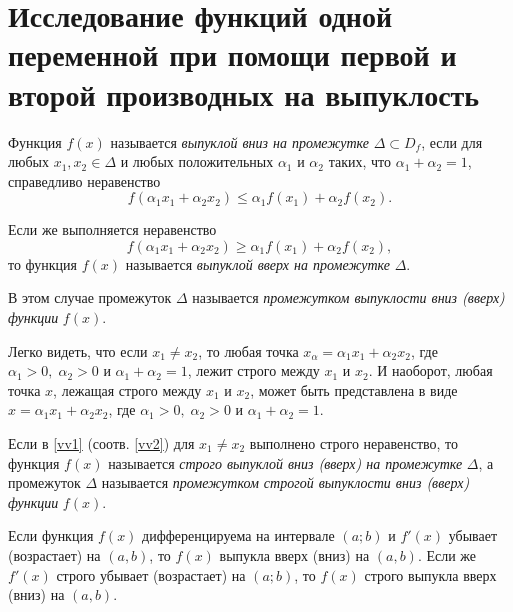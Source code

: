 \section{Исследование функций одной переменной при помощи первой и второй производных на выпуклость}

\begin{defn}
Функция $f(x)$ называется \textit{выпуклой вниз на промежутке} $\Delta\subset D_f$, если для любых $x_1,x_2\in\Delta$ и любых положительных $\alpha_1$ и $\alpha_2$ таких, что $\alpha_1+\alpha_2=1$, справедливо неравенство
\begin{equation} \label{vv1}
f(\alpha_1x_1+\alpha_2x_2) \le \alpha_1f(x_1)+\alpha_2f(x_2).
\end{equation}

Если же выполняется неравенство
\begin{equation} \label{vv2}
f(\alpha_1x_1+\alpha_2x_2) \ge \alpha_1f(x_1)+\alpha_2f(x_2),
\end{equation}
то функция $f(x)$ называется \textit{выпуклой вверх на промежутке} $\Delta$.

В этом случае промежуток $\Delta$ называется \textit{промежутком выпуклости вниз (вверх) функции} $f(x)$.
\end{defn}

Легко видеть, что если $x_1\neq x_2$, то любая точка $x_\alpha=\alpha_1x_1+\alpha_2x_2$, где $\alpha_1>0,\;\alpha_2>0$ и $\alpha_1+\alpha_2=1$, лежит строго между $x_1$ и $x_2$. И наоборот, любая точка $x$, лежащая строго между $x_1$ и $x_2$, может быть представлена в виде $x=\alpha_1x_1+\alpha_2x_2$, где $\alpha_1>0,\;\alpha_2>0$ и $\alpha_1+\alpha_2=1$.

Если в \eqref{vv1} (соотв. \eqref{vv2}) для $x_1\neq x_2$ выполнено строго неравенство, то функция $f(x)$ называется \textit{строго выпуклой вниз (вверх) на промежутке} $\Delta$, а промежуток $\Delta$ называется \textit{промежутком строгой выпуклости вниз \textup{(вверх}) функции} $f(x)$.

\begin{thm}
Если функция $f(x)$ дифференцируема на интервале $(a;b)$ и $f'(x)$ убывает (возрастает) на $(a,b)$, то $f(x)$ выпукла вверх (вниз) на $(a,b)$. Если же $f'(x)$ строго убывает (возрастает) на $(a;b)$, то $f(x)$ строго выпукла вверх (вниз) на $(a,b)$.
\end{thm}

